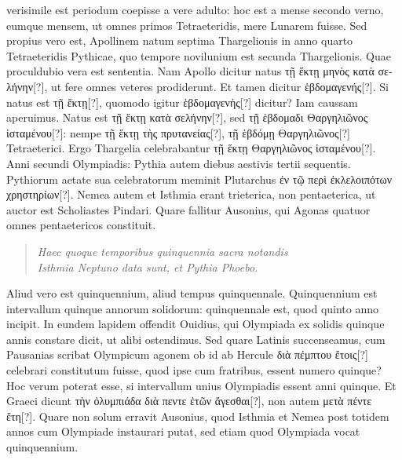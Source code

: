  verisimile est periodum
coepisse a vere adulto: hoc est a mense secondo verno, eumque
mensem, ut omnes primos Tetraeteridis, mere Lunarem fuisse.
Sed propius vero est, Apollinem natum septima Thargelionis in anno
quarto Tetraeteridis Pythicae, quo tempore novilunium est secunda
Thargelionis.
Quae proculdubio vera est sententia.
Nam Apollo dicitur
natus \textgreek{τῇ ἕκτῃ μηνὸς κατὰ σελήνην[?]},
 ut fere omnes veteres prodiderunt.
Et tamen dicitur \textgreek{ἑβδομαγενής[?]}.
Si natus est \textgreek{τῇ ἕκτῃ[?]},
 quomodo igitur \textgreek{ἑβδομαγενὴς[?]}
dicitur?
Iam caussam aperuimus.
Natus est \textgreek{τῇ ἕκτῃ κατὰ σελήνην[?]},
sed \textgreek{τῇ ἑβδομαδι Θαργηλιῶνος ἱσταμένου[?]}:
 nempe \textgreek{τῇ ἕκτῃ τὴς πρυτανείας[?]},
\textgreek{τῇ ἑβδόμῃ Θαργηλιῶνος[?]} Tetraeterici.
Ergo Thargelia celebrabantur
\textgreek{τῇ ἕκτῃ Θαργηλιῶνος ἱσταμένου[?]}.
Anni secundi Olympiadis: Pythia autem
diebus aestivis tertii sequentis.
Pythiorum aetate sua celebratorum meminit
Plutarchus \textgreek{ἐν τῷ περὶ ἐκλελοιπότων χρηστηρίων[?]}.
Nemea autem et
Isthmia erant trieterica, non pentaeterica, ut auctor est Scholiastes
Pindari.
Quare fallitur Ausonius, qui Agonas quatuor omnes pentaetericos
constituit.
\begin{verse}
\textit{Haec quoque temporibus quinquennia sacra notandis}\\
\textit{Isthmia Neptuno data sunt, et Pythia Phoebo.}
\end{verse}
Aliud vero est quinquennium, aliud tempus quinquennale.
Quinquennium est intervallum quinque annorum solidorum: quinquennale
est, quod quinto anno incipit.
In eundem lapidem offendit
Ouidius, qui Olympiada ex solidis quinque annis constare dicit, ut
alibi ostendimus.
%
Sed quare Latinis succenseamus, cum Pausanias scribat
Olympicum agonem ob id ab Hercule \textgreek{διὰ πέμπτου ἔτοις[?]} celebrari
constitutum fuisse, quod ipse cum fratribus, essent numero quinque?
Hoc verum poterat esse, si intervallum unius Olympiadis essent anni
quinque.
Et Graeci dicunt \textgreek{τὴν ὀλυμπιάδα διὰ πεντε ἐτῶν ἄγεσθαι[?]}, non
autem \textgreek{μετὰ πέντε ἔτη[?]}.
Quare non solum erravit Ausonius, quod Isthmia
et Nemea post totidem annos cum Olympiade instaurari putat, sed
etiam quod Olympiada vocat quinquennium.
\bigskip
\bigskip
\bigskip
